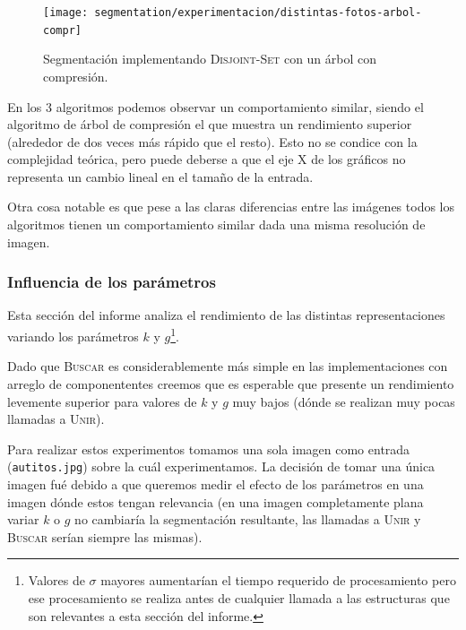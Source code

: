 \begin{figure}[H]
	\centering
	\texttt{[image: segmentation/experimentacion/distintas-fotos-arbol-compr]}
	\caption{Segmentación implementando \textsc{Disjoint-Set} con un árbol con compresión.}
\end{figure}

En los 3 algoritmos podemos observar un comportamiento similar, siendo el
algoritmo de árbol de compresión el que muestra un rendimiento superior
(alrededor de dos veces más rápido que el resto). Esto no se condice con la
complejidad teórica, pero puede deberse a que el eje X de los gráficos no
representa un cambio lineal en el tamaño de la entrada.

Otra cosa notable es que pese a las claras diferencias entre las imágenes todos
los algoritmos tienen un comportamiento similar dada una misma resolución de
imagen.

\subsubsection{Influencia de los parámetros}

Esta sección del informe analiza el rendimiento de las distintas
representaciones variando los parámetros $k$ y $g$\footnote{Valores de $\sigma$
mayores aumentarían el tiempo requerido de procesamiento pero ese procesamiento
se realiza antes de cualquier llamada a las estructuras que son relevantes a
esta sección del informe.}.

Dado que \textsc{Buscar} es considerablemente más simple en las
implementaciones con arreglo de componententes creemos que es esperable que
presente un rendimiento levemente superior para valores de $k$ y $g$ muy bajos
(dónde se realizan muy pocas llamadas a \textsc{Unir}).

Para realizar estos experimentos tomamos una sola imagen como entrada
(\texttt{autitos.jpg}) sobre la cuál experimentamos. La decisión de tomar una
única imagen fué debido a que queremos medir el efecto de los parámetros en una
imagen dónde estos tengan relevancia (en una imagen completamente plana variar
$k$ o $g$ no cambiaría la segmentación resultante, las llamadas a \textsc{Unir}
y \textsc{Buscar} serían siempre las mismas).

